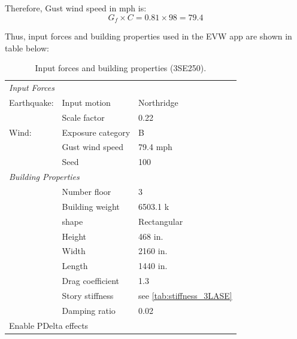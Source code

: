 \documentclass[onecolumn, fleqn]{article}
\begin{document}
Therefore, Gust wind speed in mph is:
\begin{equation*}
G_f \times C = 0.81 \times 98 = \boxed{79.4}
\end{equation*}

Thus, input forces and building properties used in the EVW app are shown in table below:

\begin{table}[H]
	\centering \caption{Input forces and building properties (3SE250).}
	\begin{tabular}{lll}
	\toprule
	\multicolumn{3}{l}{\textit{Input Forces}}					\\
	\cmidrule(rl){1-3}
	Earthquake:		& Input motion		& Northridge			\\
					& Scale factor		& 0.22					\\
	Wind:			& Exposure category	& B						\\
					& Gust wind speed	& 79.4 mph				\\
					& Seed				& 100					\\
	\midrule
	\multicolumn{3}{l}{\textit{Building Properties}}			\\
	\cmidrule(rl){1-3}
					& Number floor		& 3						\\
					& Building weight	& 6503.1 k				\\
					& shape				& Rectangular			\\
					& Height			& 468 in.				\\
					& Width				& 2160 in.				\\
					& Length			& 1440 in.				\\
					& Drag coefficient	& 1.3					\\
					& Story stiffness	& see \cref{tab:stiffness_3LASE}			\\
					& Damping ratio		& 0.02					\\
	\midrule
	\multicolumn{3}{l}{Enable PDelta effects}					\\
	\bottomrule
	\end{tabular}
\end{table}
\end{document}
